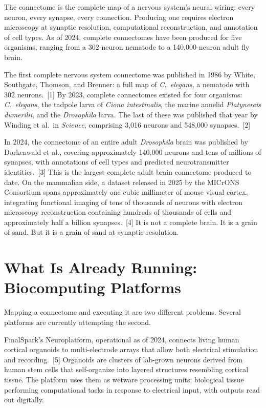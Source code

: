 \documentclass[11pt,a4paper]{article}
\begin{document}
The connectome is the complete map of a nervous system's neural wiring: every neuron, every synapse, every connection. Producing one requires electron microscopy at synaptic resolution, computational reconstruction, and annotation of cell types. As of 2024, complete connectomes have been produced for five organisms, ranging from a 302-neuron nematode to a 140,000-neuron adult fly brain.

The first complete nervous system connectome was published in 1986 by White, Southgate, Thomson, and Brenner: a full map of \textit{C.~elegans}, a nematode with 302 neurons.~[1] By 2023, complete connectomes existed for four organisms: \textit{C.~elegans}, the tadpole larva of \textit{Ciona intestinalis}, the marine annelid \textit{Platynereis dumerilii}, and the \textit{Drosophila} larva. The last of these was published that year by Winding et al.\ in \textit{Science}, comprising 3,016 neurons and 548,000 synapses.~[2]

In 2024, the connectome of an entire adult \textit{Drosophila} brain was published by Dorkenwald et al., covering approximately 140,000 neurons and tens of millions of synapses, with annotations of cell types and predicted neurotransmitter identities.~[3] This is the largest complete adult brain connectome produced to date. On the mammalian side, a dataset released in 2025 by the MICrONS Consortium spans approximately one cubic millimeter of mouse visual cortex, integrating functional imaging of tens of thousands of neurons with electron microscopy reconstruction containing hundreds of thousands of cells and approximately half a billion synapses.~[4] It is not a complete brain. It is a grain of sand. But it is a grain of sand at synaptic resolution.

\section{What Is Already Running: Biocomputing Platforms}

Mapping a connectome and executing it are two different problems. Several platforms are currently attempting the second.

FinalSpark's Neuroplatform, operational as of 2024, connects living human cortical organoids to multi-electrode arrays that allow both electrical stimulation and recording.~[5] Organoids are clusters of lab-grown neurons derived from human stem cells that self-organize into layered structures resembling cortical tissue. The platform uses them as wetware processing units: biological tissue performing computational tasks in response to electrical input, with outputs read out digitally.
\end{document}
